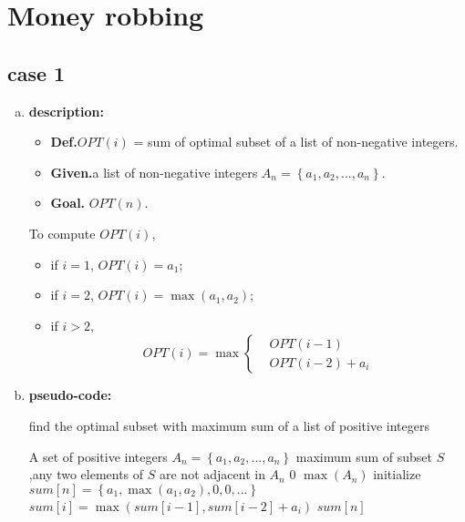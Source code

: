 \section{Money robbing}
\subsection{case 1 }
\begin{enumerate}[a).]
\item \textbf{description:}
\begin{itemize}
	\item \textbf{Def.}\qquad $OPT(i)$ = sum of optimal subset of a list of non-negative integers.
	\item \textbf{Given.}\quad a list of non-negative integers $A_n=\left\lbrace a_1,a_2,...,a_n\right\rbrace$.
	\item \textbf{Goal.} \quad$OPT(n)$.
\end{itemize}
To compute $OPT(i)$,
\begin{itemize}
	\item if $i =1$, $OPT(i) = a_1$;
	\item if $i =2$, $OPT(i) = \max(a_1,a_2 )$;
	\item if $i > 2$, \[OPT(i) = \max \left\lbrace \begin{split} 
	&OPT(i-1)  \\
	&OPT(i-2) + a_i
	\end{split} \right .\]
\end{itemize}

\item \textbf{pseudo-code:}\\
\begin{algorithm}[H]
	\caption{find the optimal subset with maximum sum of a list of positive integers}
	\begin{algorithmic}[1]
		\Require \quad A set of positive integers $A_n=\left\lbrace a_1,a_2,...,a_n\right \rbrace $
		\Ensure maximum sum of subset $S$,any two elements of $S$ are not adjacent in $A_n$
			\State \Return $0$
			\State \Return $\max(A_n)$
		\EndIf	
		\State initialize $sum[n] = \left\lbrace a_1, \max(a_1,a_2), 0,0,...\right\rbrace $
			\State $sum[i] = \max(sum[i-1], sum[i-2] + a_i )$
		\EndFor 
		\State \Return $sum[n]$
		\EndFunction
	\end{algorithmic}
\end{algorithm}


\end{enumerate}
